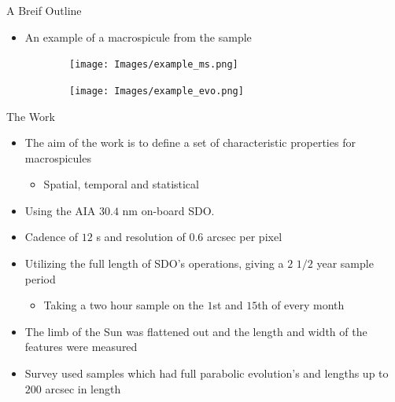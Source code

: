 \documentclass{beamer}
\begin{document}
	\begin{frame}{A Breif Outline}
		\begin{itemize}
			\item An example of a macrospicule from the sample
		\end{itemize}
	\begin{figure}
		\begin{center}
			\begin{subfigure}[b]{0.3\textwidth}
				\begin{center}
					\texttt{[image: Images/example\_ms.png]}
				\end{center}
			\end{subfigure}
			\begin{subfigure}[b]{0.495\textwidth}			
				\begin{center}
					\texttt{[image: Images/example\_evo.png]}
				\end{center}
			\end{subfigure}			
		\end{center}
	\end{figure}
	\end{frame}

	
	\begin{frame}{The Work}
		\begin{itemize}
			\item The aim of the work is to define a set of characteristic properties for macrospicules
				\begin{itemize}
					\item Spatial, temporal and statistical
				\end{itemize}
			\item Using the AIA $30.4$ nm on-board SDO.
			\item Cadence of $12$ s and resolution of $0.6$ arcsec per pixel 
			\item Utilizing the full length of SDO's operations, giving a $2$ $1/2$ year sample period
				\begin{itemize}
					\item Taking a two hour sample on the $1$st and $15$th of every month 
				\end{itemize}
			\item The limb of the Sun was flattened out and the length and width of the features were measured
			\item Survey used samples which had full parabolic evolution's and lengths up to $200$ arcsec in length
		\end{itemize}
	\end{frame}
\end{document}
